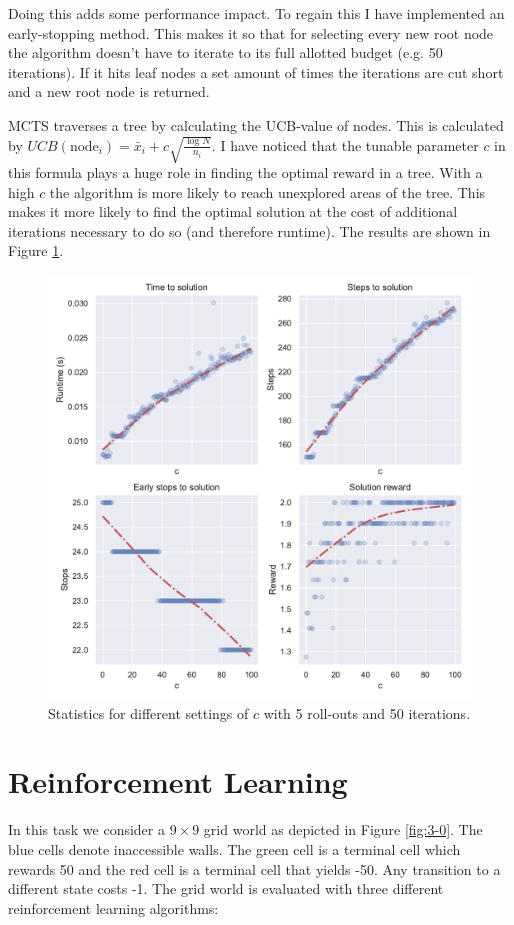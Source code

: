 \documentclass[]{scrartcl}
\begin{document}
Doing this adds some performance impact. To regain this I have implemented an early-stopping method. This makes it so that for selecting every new root node the algorithm doesn't have to iterate to its full allotted budget (e.g. 50 iterations). If it hits leaf nodes a set amount of times the iterations are cut short and a new root node is returned.

MCTS traverses a tree by calculating the UCB-value of nodes. This is calculated by $U C B(\textrm{node}_{i})=\bar{x}_{i}+c \sqrt{\frac{\log N}{n_{i}}}$. I have noticed that the tunable parameter $c$ in this  formula plays a huge role in finding the optimal reward in a tree. With a high $c$ the algorithm is more likely to reach unexplored areas of the tree. This makes it more likely to find the optimal solution at the cost of additional iterations necessary to do so (and therefore runtime). The results are shown in Figure \ref{fig:2-1}.

\begin{figure}[H]
	\centering
	\includegraphics[width=0.7\linewidth]{2-1.pdf}
	\caption{Statistics for different settings of $c$ with 5 roll-outs and 50 iterations.}
	\label{fig:2-1}
\end{figure}


\section{Reinforcement Learning}

In this task we consider a $9\times9$ grid world as depicted in Figure \ref{fig:3-0}. The blue cells denote inaccessible walls. The green cell is a terminal cell which rewards 50 and the red cell is a terminal cell that yields -50. Any transition to a different state costs -1. The grid world is evaluated with three different reinforcement learning algorithms:
\end{document}
